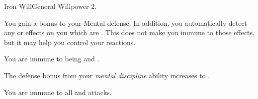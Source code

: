   \begin{feat}{Iron Will}{General}
    \featpre Willpower 2.

     You gain a  bonus to your Mental defense.
    In addition, you automatically detect any  or  effects on you which are .
    This does not make you immune to those effects, but it may help you control your reactions.

     You are immune to being \stunned and \confused.

     The defense bonus from your \textit{mental discipline} ability increases to .

     You are immune to all  and  attacks.
  \end{feat}

